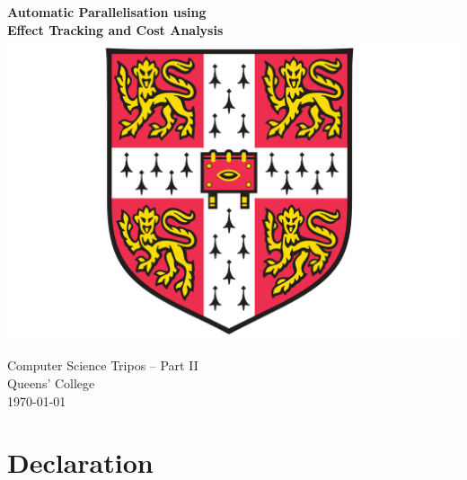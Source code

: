 \documentclass[12pt,a4paper,twoside,openright]{report}
\begin{document}



\pagestyle{empty}


\vspace*{30mm}
\begin{center}
	\Huge
	\textbf{Automatic Parallelisation using \\ Effect Tracking and Cost Analysis} \\[20mm]

	\vspace{-2mm}
	\includegraphics[scale=0.5]{./figures/crest.png}
	\hspace{0mm}\\[20mm]
	\vspace{2mm}


	\LARGE
	Computer Science Tripos -- Part II \\[1mm]
	Queens' College \\[20mm]

	\Large
	\today
\end{center}

\newpage
\thispagestyle{empty}


\pagestyle{plain}



\section*{Declaration}
\end{document}
